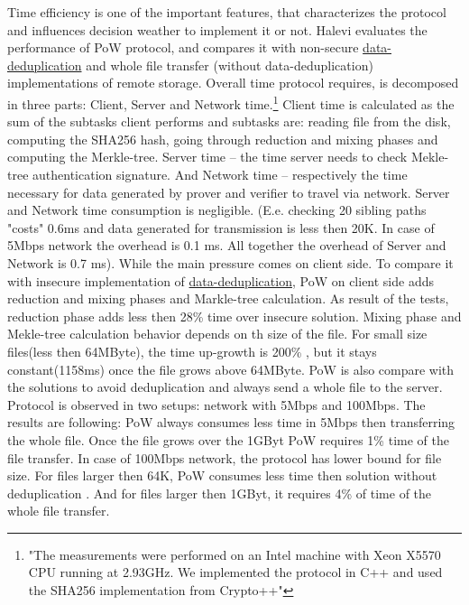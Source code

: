 \documentclass[12pt]{article}
\begin{document}
Time efficiency is one of the important features, that characterizes the protocol and influences decision weather to implement it or not. Halevi evaluates the performance of PoW protocol, and  compares it with non-secure  \hyperref [sub:Deduplication]{data-deduplication} and whole file transfer (without data-deduplication) implementations of remote storage. Overall time protocol requires, is decomposed in three parts: Client, Server and Network time.\footnote{"The measurements were performed on an Intel machine with Xeon X5570 CPU running at 2.93GHz. We implemented the protocol in C++ and used the SHA256 implementation from Crypto++"} Client time is calculated as the sum of the subtasks client performs and subtasks are: reading file from the disk, computing the SHA256 hash, going through reduction and mixing phases and  computing the Merkle-tree. Server time -- the time server needs to check Mekle-tree authentication signature. And Network time -- respectively the time necessary for data generated by prover and verifier to travel via network. Server and Network time consumption is negligible. (E.e. checking 20 sibling paths "costs" 0.6ms and data generated for transmission  is less then 20K. In case of 5Mbps network the overhead is 0.1 ms. All together the overhead of Server and Network is 0.7 ms). While the main pressure comes on client side. To  compare it with insecure implementation of \hyperref [sub:Deduplication]{data-deduplication}, PoW on client side adds reduction and mixing phases and Markle-tree calculation. As result of the tests, reduction phase adds less then 28\% time over insecure solution. Mixing phase and Mekle-tree calculation behavior depends on th size of the file. For small size files(less then 64MByte), the time up-growth is 200\% , but it stays  constant(1158ms) once the file grows above 64MByte. PoW is also  compare with the solutions to avoid deduplication and always send a whole file to the server. Protocol is observed in two setups: network with 5Mbps and 100Mbps. The results are following: PoW always consumes less time in 5Mbps then transferring the whole file. Once the file grows over the 1GByt PoW requires 1\%  time of the file transfer. In case of 100Mbps network, the protocol has lower bound for file size. For files larger then 64K, PoW consumes less time then solution without deduplication . And for files larger then 1GByt, it requires 4\% of time of the whole file transfer. 
\end{document}
